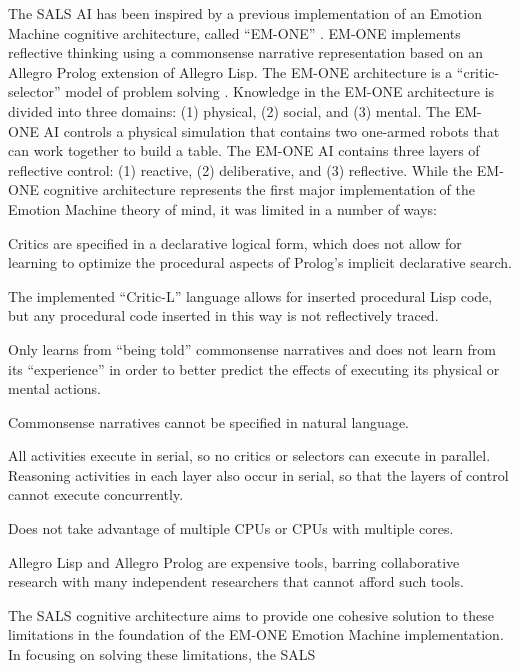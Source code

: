 The SALS AI has been inspired by a previous implementation of an
Emotion Machine cognitive architecture, called ``EM-ONE''
\cite[]{singh:2005b}.  EM-ONE implements reflective thinking using a
commonsense narrative representation based on an Allegro Prolog
extension of Allegro Lisp.  The EM-ONE architecture is a
``critic-selector'' model of problem solving
\cite[]{sussman:1973,singh:2002a,singh:2004,singh:2005a,singh:2005b,minsky:2006,morgan:2009}.
Knowledge in the EM-ONE architecture is divided into three domains:
(1) physical, (2) social, and (3) mental.  The EM-ONE AI controls a
physical simulation that contains two one-armed robots that can work
together to build a table.  The EM-ONE AI contains three layers of
reflective control: (1) reactive, (2) deliberative, and (3)
reflective.  While the EM-ONE cognitive architecture represents the
first major implementation of the Emotion Machine theory of mind, it
was limited in a number of ways:
\begin{packed_enumerate}
\item{Critics are specified in a declarative logical form, which does
  not allow for learning to optimize the procedural aspects of
  Prolog's implicit declarative search.}
\item{The implemented ``Critic-L'' language allows for inserted
  procedural Lisp code, but any procedural code inserted in this way
  is not reflectively traced.}
\item{Only learns from ``being told'' commonsense narratives and does
  not learn from its ``experience'' in order to better predict the
  effects of executing its physical or mental actions.}
\item{Commonsense narratives cannot be specified in natural language.}
\item{All activities execute in serial, so no critics or selectors can
  execute in parallel.  Reasoning activities in each layer also occur
  in serial, so that the layers of control cannot execute
  concurrently.}
\item{Does not take advantage of multiple CPUs or CPUs with multiple
  cores.}
\item{Allegro Lisp and Allegro Prolog are expensive tools, barring
  collaborative research with many independent researchers that cannot
  afford such tools.}
\end{packed_enumerate}
The SALS cognitive architecture aims to provide one cohesive solution
to these limitations in the foundation of the EM-ONE Emotion Machine
implementation.  In focusing on solving these limitations, the SALS
